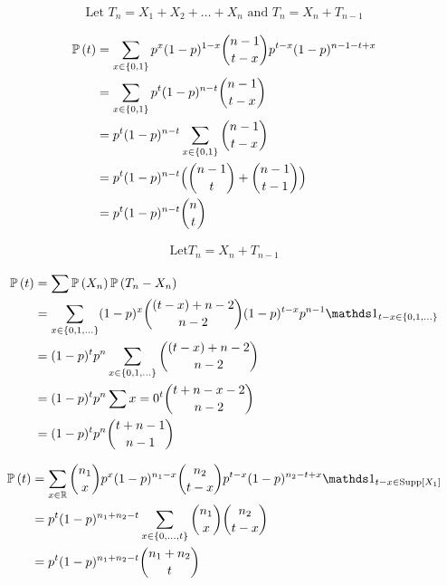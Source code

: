 \documentclass[12pt]{article}
\begin{document}
\begin{enumerate}

\begin{align*}
    \text{Let $T_n = X_1 + X_2 + \ldots + X_n$ and $T_n = X_n + T_{n-1}$} 
\end{align*}

\begin{align*}
    \mathbb{P}\left(t\right) &= \sum_{x \in \left\{0, 1\right\}} p^x(1-p)^{1-x} {n-1 \choose t-x}p^{t-x}(1-p)^{n-1-t+x} \\
    &= \sum_{x \in \left\{0, 1\right\}} p^t(1-p)^{n-t}{n-1 \choose t-x} \\
    &= p^t(1-p)^{n-t} \sum_{x \in \left\{0, 1\right\}}{n-1 \choose t-x} \\ 
    &= p^t(1-p)^{n-t} \Big( {n-1 \choose t} + {n-1 \choose t-1}\Big) \\ 
    &= p^t(1-p)^{n-t} {n \choose t}
\end{align*}


\begin{align*}
    \text{Let} T_n = X_n + T_{n-1}
\end{align*}

\begin{align*}
    \prob{t} &= \sum \prob{X_n}\prob{T_n - X_n} \\
    &= \sum_{x \in \braces{0, 1, \ldots}} (1-p)^{x} {(t-x)+n-2 \choose n-2}(1-p)^{t-x}p^{n-1}\indic{t-x\in \braces{0, 1, \ldots}} \\
    &= (1-p)^{t}p^{n} \sum_{x \in \braces{0, 1, \ldots}} {(t-x)+n-2 \choose n-2} \\
    &= (1-p)^{t}p^{n}\sum{x=0}^{t} {t+n-x-2 \choose n-2} \\
    &= (1-p)^{t}p^{n} {t+n-1 \choose n-1}
\end{align*}



\begin{align*}
    \prob{t} &= \sum_{x \in \reals} {n_1 \choose x}p^x(1-p)^{n_1-x}{n_2 \choose t-x}p^{t-x}(1-p)^{n_2-t+x}\indic{t-x \in \support{X_1}} \\ 
    &= p^t(1-p)^{n_1+n_2-t}\sum_{x \in \braces{0, \ldots, t}}{n_1 \choose x}{n_2 \choose t-x} \\
    &= p^t(1-p)^{n_1+n_2-t}{n_1 + n_2 \choose t}
\end{align*}


\end{enumerate}
\end{document}

